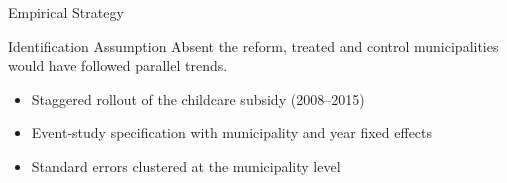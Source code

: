 \documentclass[aspectratio=169]{beamer}
\begin{document}
\begin{frame}{Empirical Strategy}
  \begin{block}{Identification Assumption}
    Absent the reform, treated and control municipalities would have followed parallel trends.
  \end{block}
  \begin{itemize}
    \item Staggered rollout of the childcare subsidy (2008--2015)
    \item Event-study specification with municipality and year fixed effects
    \item Standard errors clustered at the municipality level
  \end{itemize}
\end{frame}
\end{document}

